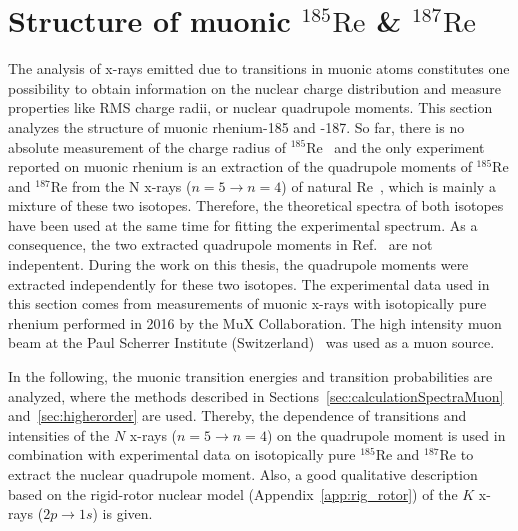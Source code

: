 \section{Structure of muonic $^{185}\text{Re}$ \& $^{187}\text{Re}$}
\label{sec:muon_re}
The analysis of x-rays emitted due to transitions in muonic atoms constitutes one possibility to obtain information on the nuclear charge distribution and measure properties like RMS charge radii, or nuclear quadrupole moments. This section analyzes the structure of muonic rhenium-185 and -187. So far, there is no absolute measurement of the charge radius of $^{185}$Re~\cite{schopper2004} and the only experiment reported on muonic rhenium is an extraction of the quadrupole moments of $^{185}$Re and $^{187}$Re from the N x-rays (${n}{=}{5}\rightarrow{n}{=}{4}$) of natural Re~\cite{konijn1979}, which is mainly a mixture of these two isotopes. Therefore, the theoretical spectra of both isotopes have been used at the same time for fitting the experimental spectrum. As a consequence, the two extracted quadrupole moments in Ref.~\cite{konijn1979} are not indepentent. During the work on this thesis, the quadrupole moments were extracted independently for these two isotopes.
The experimental data used in this section comes from measurements of muonic x-rays with isotopically pure rhenium performed in 2016 by the MuX Collaboration. The high intensity muon beam at the Paul Scherrer Institute (Switzerland)~\cite{psiExperiments,psiFacilities} was used as a muon source.

In the following, the muonic transition energies and transition probabilities are analyzed, where the methods described in Sections~\ref{sec:calculationSpectraMuon} and~\ref{sec:higherorder} are used. Thereby, the dependence of transitions and intensities of the $N$ x-rays ($n=5\rightarrow n=4$) on the quadrupole moment is used in combination with experimental data on isotopically pure $^{185}$Re and $^{187}$Re to extract the nuclear quadrupole moment. Also, a good qualitative description based on the rigid-rotor nuclear model (Appendix~\ref{app:rig_rotor}) of the $K$ x-rays ($2p\rightarrow 1s$) is given.


